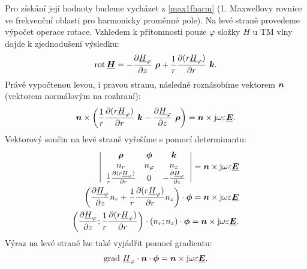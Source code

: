 \documentclass[12pt,a4paper,oneside]{article}
\numberwithin{equation}{section} %
\numberwithin{figure}{section} %
\numberwithin{table}{section} %
\newcommand{\mj}{\mathrm{j}} %
\renewcommand{\vec}[1]{\mbox{\boldmath$#1$}} %
\newcommand{\faz}[1]{{\underline{#1}}} %
\newcommand{\grad}{\mathrm{grad}\ }
\newcommand{\rot}{\mathrm{rot}\ }
\begin{document}
Pro získání její hodnoty budeme vycházet z \ref{max1fharm} (1. Maxwellovy rovnice ve frekvenční oblasti pro harmonicky proměnné pole). Na levé straně provedeme výpočet operace rotace. Vzhledem k přítomnosti pouze $\varphi$ složky $H$ u TM vlny dojde k zjednodušení výsledku:
\begin{equation}
\rot \! \faz{\vec{H}} = - \frac{\partial \faz{H} _{\varphi}}{\partial z} ~ \vec{\rho} + \frac{1}{r} \frac{\partial ( r \faz{H} _{\varphi} ) }{\partial r} ~ \vec{k} .
\end{equation}
Právě vypočtenou levou, i pravou stranu, následně roznásobíme vektorem $\vec{n}$ (vektorem normálovým na rozhraní):
\begin{equation}
\vec{n} \times \left( \frac{1}{r} \frac{\partial ( r \faz{H} _{\varphi} ) }{\partial r} ~ \vec{k} - \frac{\partial \faz{H} _{\varphi}}{\partial z} ~ \vec{\rho} \right) = \vec{n} \times \mj \omega \varepsilon \faz{\vec{E}} .
\end{equation}
Vektorový součin na levé straně vyřešíme s pomocí determinantu:
\begin{subequations}
\begin{align}
\left| 
\begin{array}{c c c}
\vec{\rho} & \vec{\phi} & \vec{k} \\ 
n_r & n_{\varphi} & n_z \\
\frac{1}{r} \frac{\partial ( r \faz{H} _{\varphi} ) }{\partial r} & 0 & - \frac{\partial \faz{H} _{\varphi}}{\partial z}
\end{array}
\right|
= \vec{n} \times \mj \omega \varepsilon \faz{\vec{E}}
\\
\left( \frac{\partial \faz{H} _{\varphi}}{\partial z} n_{r} + \frac{1}{r} \frac{\partial ( r \faz{H} _{\varphi} ) }{\partial r} n_z \right) \cdot \vec{\phi} = \vec{n} \times \mj \omega \varepsilon \faz{\vec{E}}
\\
\left( \frac{\partial \faz{H} _{\varphi}}{\partial z} ;\frac{1}{r} \frac{\partial ( r \faz{H}_{\varphi} ) }{\partial r} \right) \cdot \left( n_r; n_{z} \right) \cdot \vec{\phi} = \vec{n} \times \mj \omega \varepsilon \faz{\vec{E}} .
\end{align}
\end{subequations}
Výraz na levé straně lze také vyjádřit pomocí gradientu:
\begin{equation}
\grad \faz{H} _{\varphi} \cdot \vec{n} \cdot \vec{\phi} = \vec{n} \times \mj \omega \varepsilon \faz{\vec{E}} .
\end{equation}
\end{document}
